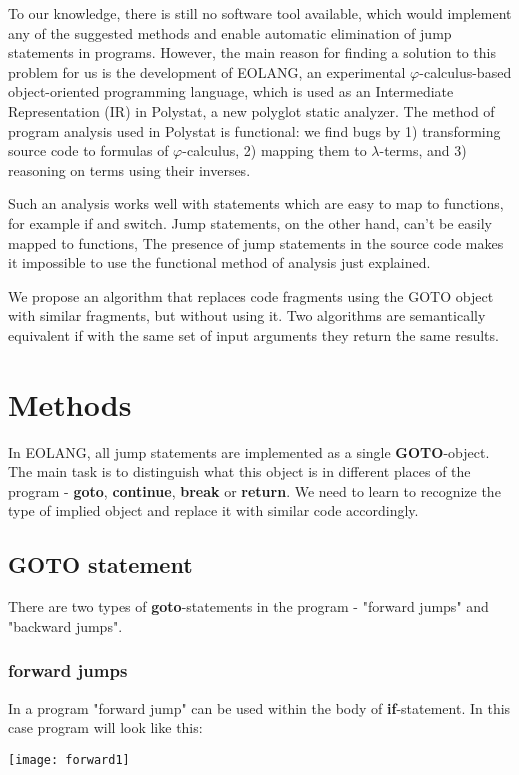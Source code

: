 \documentclass[two column]{article}
\begin{document}
To our knowledge, there is still no software tool available, which would implement any of the suggested methods and enable automatic elimination of jump statements in programs. However, the main reason for finding a solution to this problem for us is the development of EOLANG, an experimental \(\varphi\)-calculus-based object-oriented programming language, which is used as an Intermediate Representation (IR) in Polystat, a new polyglot static analyzer. The method of program analysis used in Polystat is functional: we find bugs by 1) transforming source code to formulas of \(\varphi\)-calculus, 2) mapping them to \(\lambda\)-terms, and 3) reasoning on terms using their inverses.

Such an analysis works well with statements which are easy to map to functions, for example if and switch. Jump statements, on the other hand, can't be easily mapped to functions, The presence of jump statements in the source code makes it impossible to use the functional method of analysis just explained.

We propose an algorithm that replaces code fragments using the GOTO object with similar fragments, but without using it. Two algorithms are semantically equivalent if with the same set of input arguments they return the same results.

\section{Methods}
In EOLANG, all jump statements are implemented as a single \textbf{GOTO}-object. The main task is to distinguish what this object is in different places of the program - \textbf{goto}, \textbf{continue}, \textbf{break} or \textbf{return}. We need to learn to recognize the type of implied object and replace it with similar code accordingly.

\subsection{GOTO statement}
There are two types of \textbf{goto}-statements in the program - "forward jumps" and "backward jumps".
\subsubsection{forward jumps}
In a program "forward jump" can be used within the body of \textbf{if}-statement. In this case program will look like this:

\texttt{[image: forward1]}
\end{document}
